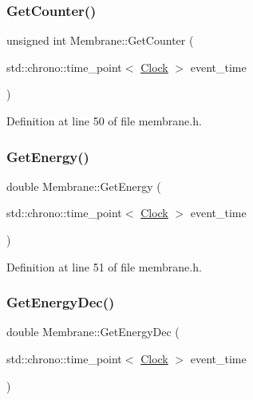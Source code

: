 \subsubsection{\texorpdfstring{Get\+Counter()}{GetCounter()}}
{\footnotesize\ttfamily unsigned int Membrane\+::\+Get\+Counter (\begin{DoxyParamCaption}\item[{std\+::chrono\+::time\+\_\+point$<$ \hyperlink{universe_8h_a0ef8d951d1ca5ab3cfaf7ab4c7a6fd80}{Clock} $>$}]{event\+\_\+time }\end{DoxyParamCaption})\hspace{0.3cm}{\ttfamily [inline]}}



Definition at line 50 of file membrane.\+h.

\mbox{\label{class_membrane_a50d39c596daa7af8da7dd7215d3a32ba}} 
\subsubsection{\texorpdfstring{Get\+Energy()}{GetEnergy()}}
{\footnotesize\ttfamily double Membrane\+::\+Get\+Energy (\begin{DoxyParamCaption}\item[{std\+::chrono\+::time\+\_\+point$<$ \hyperlink{universe_8h_a0ef8d951d1ca5ab3cfaf7ab4c7a6fd80}{Clock} $>$}]{event\+\_\+time }\end{DoxyParamCaption})\hspace{0.3cm}{\ttfamily [inline]}}



Definition at line 51 of file membrane.\+h.

\mbox{\label{class_membrane_a874068c028004d4dde7ec41d999872eb}} 
\subsubsection{\texorpdfstring{Get\+Energy\+Dec()}{GetEnergyDec()}}
{\footnotesize\ttfamily double Membrane\+::\+Get\+Energy\+Dec (\begin{DoxyParamCaption}\item[{std\+::chrono\+::time\+\_\+point$<$ \hyperlink{universe_8h_a0ef8d951d1ca5ab3cfaf7ab4c7a6fd80}{Clock} $>$}]{event\+\_\+time }\end{DoxyParamCaption})\hspace{0.3cm}{\ttfamily [inline]}}



